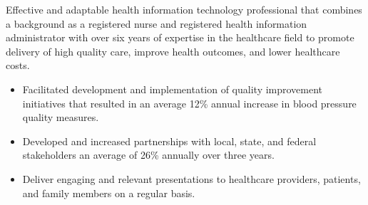 

\begin{cvparagraph}

Effective and adaptable health information technology professional that combines a background as a registered nurse and registered health information administrator with over six years of expertise in the healthcare field to promote delivery of high quality care, improve health outcomes, and lower healthcare costs.
    \begin{itemize}[topsep=0pt,itemsep=0pt,parsep=0pt,partopsep=0pt,leftmargin=4mm]
    \item Facilitated development and implementation of quality improvement initiatives that resulted in an average 12\% annual increase in blood pressure quality measures. 
    \item Developed and increased partnerships with local, state, and federal stakeholders an average of 26\% annually over three years. 
    \item Deliver engaging and relevant presentations to healthcare providers, patients, and family members on a regular basis.
    \end{itemize}
\end{cvparagraph}
